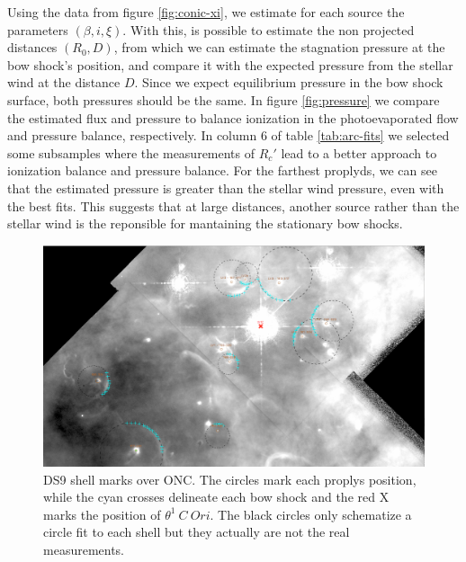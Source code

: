 Using the data from figure \ref{fig:conic-xi}, we estimate for each source the parameters $(\beta,i,\xi)$. With this, is possible to estimate the non projected distances $(R_0,D)$, 
from which we can estimate the stagnation pressure at the bow shock's position, 
and compare it with the expected pressure from the stellar wind at the distance $D$. Since we expect equilibrium pressure in the bow shock surface, both pressures should be the same. 
In figure \ref{fig:pressure} we compare the estimated flux and pressure to balance ionization in the photoevaporated flow and pressure balance, respectively. In column 6 of table \ref{tab:arc-fits}
we selected some subsamples where the measurements of $R_c'$ lead to a better approach to ionization balance and pressure balance. 
For the farthest proplyds, we can see that the estimated pressure is greater than the stellar wind pressure, even with the best fits. This suggests that at large distances, another source rather than the 
stellar wind is the reponsible for mantaining the stationary bow shocks. 

\begin{figure}
\includegraphics[width=\linewidth]{LV-full-field-annotated.png}
\caption{DS9 shell marks over ONC. The circles mark each proplys position, while the cyan crosses delineate each bow shock and the red X marks the position of $\theta^1 ~C~Ori$. 
The black circles only schematize a circle fit to each shell but they actually are not the real measurements.}
\label{fig:radii-measures-example}
\end{figure}


